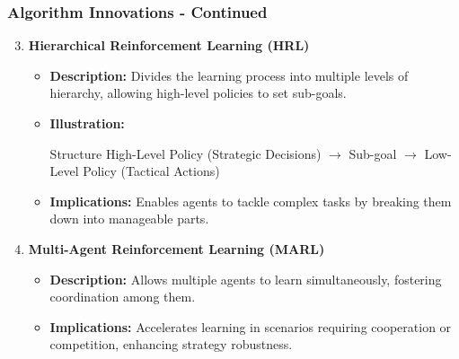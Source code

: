 \documentclass{beamer}
\begin{document}
\begin{frame}[fragile]
    \frametitle{Algorithm Innovations - Continued}
    \begin{enumerate}
        \setcounter{enumi}{2} %
        \item \textbf{Hierarchical Reinforcement Learning (HRL)}
            \begin{itemize}
                \item \textbf{Description:} Divides the learning process into multiple levels of hierarchy, allowing high-level policies to set sub-goals.
                \item \textbf{Illustration:}
                \begin{block}{Structure}
                    High-Level Policy (Strategic Decisions) $\rightarrow$ Sub-goal $\rightarrow$ Low-Level Policy (Tactical Actions)
                \end{block}
                \item \textbf{Implications:} Enables agents to tackle complex tasks by breaking them down into manageable parts.
            \end{itemize}
        
        \item \textbf{Multi-Agent Reinforcement Learning (MARL)}
            \begin{itemize}
                \item \textbf{Description:} Allows multiple agents to learn simultaneously, fostering coordination among them.
                \item \textbf{Implications:} Accelerates learning in scenarios requiring cooperation or competition, enhancing strategy robustness.
            \end{itemize}
    \end{enumerate}
\end{frame}
\end{document}
